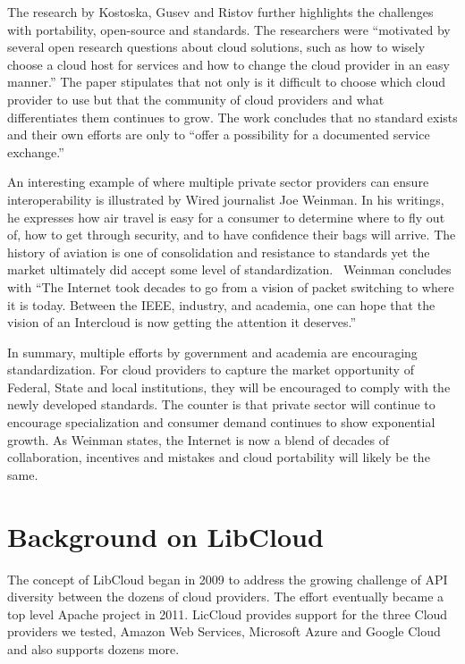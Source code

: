 The research by Kostoska, Gusev and Ristov further highlights the
challenges with portability, open-source and standards. The
researchers were ``motivated by several open research questions about
cloud solutions, such as how to wisely choose a cloud host for
services and how to change the cloud provider in an easy
manner.''\cite{hid-sp18-518-Kostoska-Gusev-Ristov} The paper
stipulates that not only is it difficult to choose which cloud
provider to use but that the community of cloud providers and what
differentiates them continues to grow. The work concludes that no
standard exists and their own efforts are only to ``offer a
possibility for a documented service exchange.''

An interesting example of where multiple private sector providers can ensure
interoperability is illustrated by Wired journalist Joe Weinman. In his
writings, he expresses how air travel is easy for a consumer to determine where
to fly out of, how to get through security, and to have confidence their bags
will arrive. The history of aviation is one of consolidation and resistance to
standards yet the market ultimately did accept some level of
standardization.~\cite{hid-sp18-518-Wired} Weinman concludes with ``The Internet
took decades to go from a vision of packet switching to where it is today. 
Between the IEEE, industry, and academia, one can hope that the vision of an
Intercloud is now getting the attention it deserves.''

In summary, multiple efforts by government and academia are encouraging
standardization. For cloud providers to capture the market opportunity of
Federal, State and local institutions, they will be encouraged to comply with
the newly developed standards. The counter is that private sector will continue
to encourage specialization and consumer demand continues to show exponential
growth. As Weinman states, the Internet is now a blend of decades of
collaboration, incentives and mistakes and cloud portability will likely be the
same.

\section{Background on LibCloud}

The concept of LibCloud began in 2009 to address the growing challenge of API
diversity between the dozens of cloud providers. The effort eventually became a
top level Apache project in 2011. LicCloud provides support for the three Cloud
providers we tested, Amazon Web Services, Microsoft Azure and Google Cloud and
also supports dozens more.


